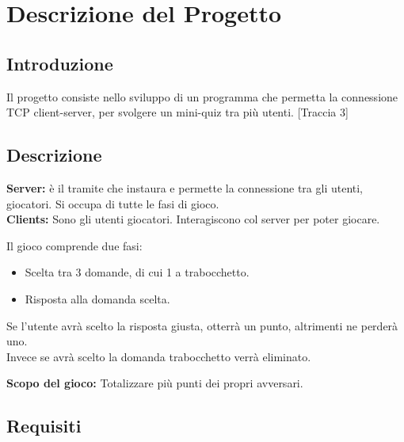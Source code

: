 

\section{Descrizione del Progetto}

\subsection{Introduzione}

\textsf{\normalsize Il progetto consiste nello sviluppo di un programma che permetta la connessione TCP client-server, per svolgere un mini-quiz tra più utenti. [Traccia 3]} \\

\subsection{Descrizione}

\textsf{\normalsize \textbf{Server:} è il tramite che instaura e permette la connessione tra gli utenti, giocatori. Si occupa di tutte le fasi di gioco.}\\

\textsf{\normalsize \textbf{Clients: } Sono gli utenti giocatori. Interagiscono col server per poter giocare.}\break

\textsf{\normalsize Il gioco comprende due fasi:}
\begin{itemize}
	\item \textsf{\normalsize Scelta tra 3 domande, di cui 1 a trabocchetto.}
	\item \textsf{\normalsize Risposta alla domanda scelta.}
\end{itemize}

\textsf{\normalsize Se l'utente avrà scelto la risposta giusta, otterrà un punto, altrimenti ne perderà uno.} \\
\textsf{\normalsize Invece se avrà scelto la domanda trabocchetto verrà eliminato.}\break

\textsf{\normalsize \textbf{Scopo del gioco:} Totalizzare più punti dei propri avversari.}\\

\subsection{Requisiti}

